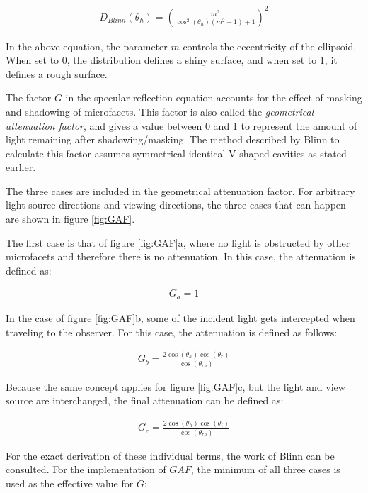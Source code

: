 	\begin{eqnarray*}
		D_{Blinn}(\theta_h) = \left({ \frac{m^2}{\cos^2(\theta_h)(m^2-1)+1} } \right)^2
	\end{eqnarray*}

\noindent In the above equation, the parameter $m$ controls the eccentricity of the ellipsoid. When set to 0, the distribution defines a shiny surface, and when set to 1, it defines a rough surface.

The factor $G$ in the specular reflection equation accounts for the effect of masking and shadowing of microfacets. This factor is also called the \textit{geometrical attenuation factor}, and gives a value between 0 and 1 to represent the amount of light remaining after shadowing/masking. The method described by Blinn to calculate this factor assumes symmetrical identical V-shaped cavities as stated earlier. 

The three cases are included in the geometrical attenuation factor. For arbitrary light source directions and viewing directions, the three cases that can happen are shown in figure \ref{fig:GAF}.

The first case is that of figure \ref{fig:GAF}a, where no light is obstructed by other microfacets and therefore there is no attenuation. In this case, the attenuation is defined as:

	\begin{eqnarray*}
		G_a = 1
	\end{eqnarray*}

In the case of figure \ref{fig:GAF}b, some of the incident light gets intercepted when traveling to the observer. For this case, the attenuation is defined as follows:

	\begin{eqnarray*}
		G_b = \frac{2\cos(\theta_h)\cos(\theta_r)}{\cos(\theta_{rh})}
	\end{eqnarray*}

\noindent Because the same concept applies for figure \ref{fig:GAF}c, but the light and view source are interchanged, the final attenuation can be defined as:

	\begin{eqnarray*}
		G_c = \frac{2\cos(\theta_h)\cos(\theta_i)}{\cos(\theta_{rh})}
	\end{eqnarray*}

\noindent For the exact derivation of these individual terms, the work of Blinn \cite{Blinn} can be consulted. For the implementation of $GAF$, the minimum of all three cases is used as the effective value for $G$:

